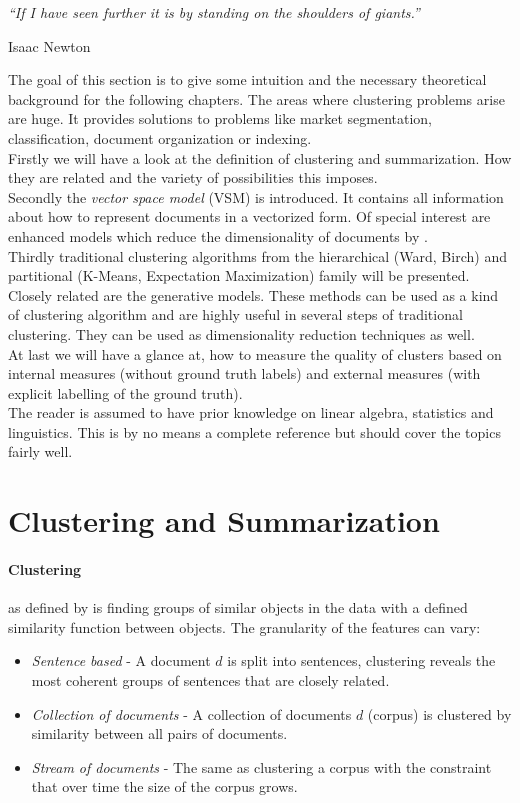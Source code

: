 \epigraph{\emph{
  ``If I have seen further it is by standing on the shoulders of giants.''
}}{ Isaac Newton }

The goal of this section is to give some intuition and the necessary theoretical background for the following chapters. The areas where clustering problems arise are huge. It provides solutions to problems like market segmentation, classification, document organization or indexing.\\
Firstly we will have a look at the definition of clustering and summarization. How they are related and the variety of possibilities this imposes.\\
Secondly the \emph{vector space model} (VSM) is introduced. It contains all information about how to represent documents in a vectorized form. Of special interest are enhanced models which reduce the dimensionality of documents by \svdfull{}.\\
Thirdly traditional clustering algorithms from the hierarchical (Ward, Birch) and partitional (K-Means, Expectation Maximization) family will be presented. Closely related are the generative models. These methods can be used as a kind of clustering algorithm and are highly useful in several steps of traditional clustering. They can be used as dimensionality reduction techniques as well.\\
At last we will have a glance at, how to measure the quality of clusters based on internal measures (without ground truth labels) and external measures (with explicit labelling of the ground truth).\\
The reader is assumed to have prior knowledge on linear algebra, statistics and linguistics. This is by no means a complete reference but should cover the topics fairly well.\\


\section{Clustering and Summarization}
\label{sec:basics_intro}

  \paragraph{Clustering} as defined by \cite{ClusterAlgoSurveyIBM} is finding groups of similar objects in the data with a defined similarity function between objects. The granularity of the features can vary:

  \begin{itemize}
    \item \emph{Sentence based} - A document $d$ is split into sentences, clustering reveals the most coherent groups of sentences that are closely related.
    \item \emph{Collection of documents} - A collection of documents $d$ (corpus) is clustered by similarity between all pairs of documents.
    \item \emph{Stream of documents} - The same as clustering a corpus with the constraint that over time the size of the corpus grows.
  \end{itemize}

